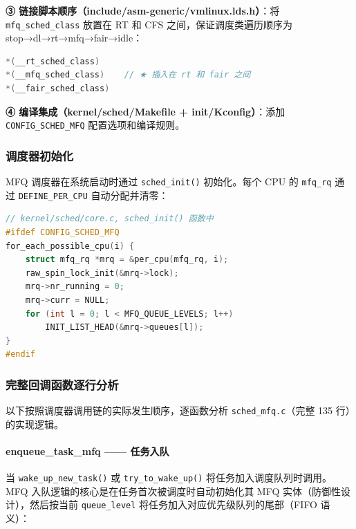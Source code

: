 \documentclass[a4paper]{article}
\begin{document}
\textbf{③ 链接脚本顺序（include/asm-generic/vmlinux.lds.h）}：将 \texttt{mfq\_sched\_class} 放置在 RT 和 CFS 之间，保证调度类遍历顺序为 stop→dl→rt→mfq→fair→idle：

\begin{lstlisting}[language=C, caption={链接脚本中的 MFQ 位置（include/asm-generic/vmlinux.lds.h）}, label={lst:mfq_linker}]
*(__rt_sched_class)
*(__mfq_sched_class)    // ★ 插入在 rt 和 fair 之间
*(__fair_sched_class)
\end{lstlisting}

\textbf{④ 编译集成（kernel/sched/Makefile + init/Kconfig）}：添加 \texttt{CONFIG\_SCHED\_MFQ} 配置选项和编译规则。

\subsubsection{调度器初始化}

MFQ 调度器在系统启动时通过 \texttt{sched\_init()} 初始化。每个 CPU 的 \texttt{mfq\_rq} 通过 \texttt{DEFINE\_PER\_CPU} 自动分配并清零：

\begin{lstlisting}[language=C, caption={MFQ 调度器初始化（kernel/sched/core.c）}, label={lst:mfq_init}]
// kernel/sched/core.c, sched_init() 函数中
#ifdef CONFIG_SCHED_MFQ
for_each_possible_cpu(i) {
    struct mfq_rq *mrq = &per_cpu(mfq_rq, i);
    raw_spin_lock_init(&mrq->lock);
    mrq->nr_running = 0;
    mrq->curr = NULL;
    for (int l = 0; l < MFQ_QUEUE_LEVELS; l++)
        INIT_LIST_HEAD(&mrq->queues[l]);
}
#endif
\end{lstlisting}

\subsubsection{完整回调函数逐行分析}

以下按照调度器调用链的实际发生顺序，逐函数分析 \texttt{sched\_mfq.c}（完整 135 行）的实现逻辑。

\paragraph{enqueue\_task\_mfq —— 任务入队}

当 \texttt{wake\_up\_new\_task()} 或 \texttt{try\_to\_wake\_up()} 将任务加入调度队列时调用。MFQ 入队逻辑的核心是在任务首次被调度时自动初始化其 MFQ 实体（防御性设计），然后按当前 \texttt{queue\_level} 将任务加入对应优先级队列的尾部（FIFO 语义）：
\end{document}
